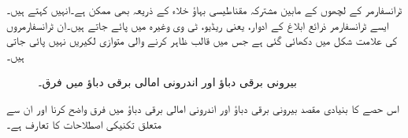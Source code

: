 ٹرانسفارمر کے لچھوں کے مابین مشترکہ مقناطیسی بہاؤ خلاء کے ذریعہ بھی ممکن ہے۔انہیں   کہتے ہیں۔ ایسے ٹرانسفارمر ذرائع ابلاغ کے ادوار، یعنی ریڈیو، ٹی وی وغیرہ میں پائے جاتے ہیں۔ان ٹرانسفارمروں کی علامت  شکل  میں دکھائی گئی ہے  جس میں  قالب ظاہر کرنے والی متوازی لکیریں نہیں پائی جاتی ہیں۔
\begin{figure}
\centering
\begin{minipage}{0.30\textwidth}
\centering
{}
\caption{خلائی ٹرانسفارمر کی علامت۔}
\label{شکل_ٹرانسفارمر_خلائی_قالب_علامت}
\end{minipage}%
\begin{minipage}{0.60\textwidth}
\centering
\caption{بیرونی برقی دباؤ اور اندرونی امالی برقی دباؤ میں فرق۔}
\label{شکل_ٹرانسفارمر_بیرونی_اور_اندرونی_برقی_دباو}
\end{minipage}
\end{figure}


اس حصے کا بنیادی مقصد بیرونی برقی دباؤ   اور اندرونی امالی برقی دباؤ   میں فرق واضح کرنا اور ان سے متعلق  تکنیکی اصطلاحات کا تعارف  ہے۔

